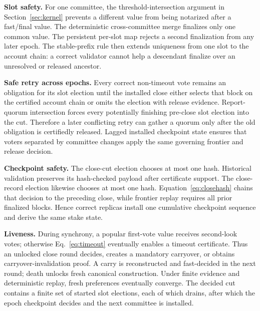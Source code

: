 \documentclass[sigplan,review,anonymous]{acmart}
\newcommand{\paragraphhead}[1]{\smallskip\noindent\textbf{#1}}
\begin{document}
\paragraphhead{Slot safety.}
For one committee, the threshold-intersection argument in Section~\ref{sec:kernel} prevents a different value from being notarized after a fast/final value.  The deterministic cross-committee merge finalizes only one common value.  The persistent per-slot map rejects a second finalization from any later epoch.  The stable-prefix rule then extends uniqueness from one slot to the account chain: a correct validator cannot help a descendant finalize over an unresolved or released ancestor.

\paragraphhead{Safe retry across epochs.}
Every correct non-timeout vote remains an obligation for its slot election until the installed close either selects that block on the certified account chain or omits the election with release evidence.  Report-quorum intersection forces every potentially finishing pre-close slot election into the cut.  Therefore a later conflicting retry can gather a quorum only after the old obligation is certifiedly released.  Lagged installed checkpoint state ensures that voters separated by committee changes apply the same governing frontier and release decision.

\paragraphhead{Checkpoint safety.}
The close-cut election chooses at most one hash. Historical validation preserves its hash-checked payload after certificate support. The close-record election likewise chooses at most one hash. Equation~\eqref{eq:closehash} chains that decision to the preceding close, while frontier replay requires all prior finalized blocks. Hence correct replicas install one cumulative checkpoint sequence and derive the same stake state.

\paragraphhead{Liveness.}
During synchrony, a popular first-vote value receives second-look votes; otherwise Eq.~\eqref{eq:timeout} eventually enables a timeout certificate.  Thus an unlocked close round decides, creates a mandatory carryover, or obtains carryover-invalidation proof.  A carry is reconstructed and fast-decided in the next round; death unlocks fresh canonical construction.  Under finite evidence and deterministic replay, fresh preferences eventually converge.  The decided cut contains a finite set of started slot elections, each of which drains, after which the epoch checkpoint decides and the next committee is installed.
\end{document}

